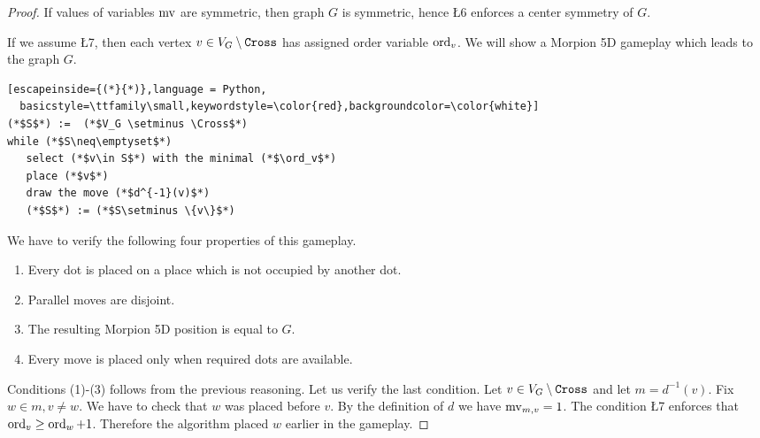 \begin{proof}
  If values of variables $\operatorname{mv}$ are symmetric, then graph $G$ is symmetric, hence \L{6} enforces a center symmetry of $G$.
  
  If we assume \L{7}, then each vertex $v \in V_G \setminus \texttt{Cross}$ has assigned order variable $\operatorname{ord}_v$. We will show 
a Morpion 5D gameplay which leads to the graph $G$. 
\begin{lstlisting}[escapeinside={(*}{*)},language = Python,
  basicstyle=\ttfamily\small,keywordstyle=\color{red},backgroundcolor=\color{white}]
(*$S$*) :=  (*$V_G \setminus \Cross$*)
while (*$S\neq\emptyset$*)
   select (*$v\in S$*) with the minimal (*$\ord_v$*)
   place (*$v$*)  
   draw the move (*$d^{-1}(v)$*)
   (*$S$*) := (*$S\setminus \{v\}$*) 
\end{lstlisting}
We have to verify the following four properties of this gameplay. 
\begin{enumerate}[label=(\arabic*)]
\item Every dot is placed on a place which is not occupied by another dot.  
\item Parallel moves are disjoint. 
\item The resulting Morpion 5D position is equal to $G$. 
\item Every move is placed only when required dots are available. 
\end{enumerate}
Conditions (1)-(3) follows from the previous reasoning. Let us verify the last condition. Let $v\in V_G \setminus \texttt{Cross}$
and let $m=d^{-1}(v)$. Fix $w \in m, v \neq w$. We have to check that $w$ was placed before $v$.
By the definition of $d$ we have $\operatorname{mv}_{m, v} = 1$. %
The condition \L{7} enforces that $\operatorname{ord}_{v} \geq \operatorname{ord}_w+1$. %
  Therefore the algorithm placed $w$ earlier in the gameplay. %
\end{proof}

